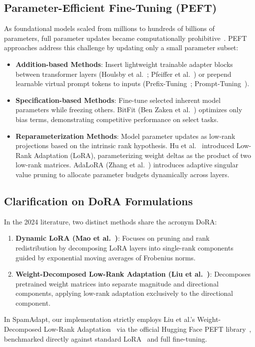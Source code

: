 \documentclass[conference]{IEEEtran}
\begin{document}
\subsection{Parameter-Efficient Fine-Tuning (PEFT)}
As foundational models scaled from millions to hundreds of billions of parameters, full parameter updates became computationally prohibitive~\cite{ding2023peft_nature}. PEFT approaches address this challenge by updating only a small parameter subset:
\begin{itemize}
    \item \textbf{Addition-based Methods}: Insert lightweight trainable adapter blocks between transformer layers (Houlsby et al.~\cite{houlsby2019adapter}; Pfeiffer et al.~\cite{pfeiffer2021adapterfusion}) or prepend learnable virtual prompt tokens to inputs (Prefix-Tuning~\cite{li2021prefix}; Prompt-Tuning~\cite{lester2021prompt}).
    \item \textbf{Specification-based Methods}: Fine-tune selected inherent model parameters while freezing others. BitFit (Ben Zaken et al.~\cite{zaken2022bitfit}) optimizes only bias terms, demonstrating competitive performance on select tasks.
    \item \textbf{Reparameterization Methods}: Model parameter updates as low-rank projections based on the intrinsic rank hypothesis. Hu et al.~\cite{hu2022lora} introduced Low-Rank Adaptation (LoRA), parameterizing weight deltas as the product of two low-rank matrices. AdaLoRA (Zhang et al.~\cite{zhang2023adalora}) introduces adaptive singular value pruning to allocate parameter budgets dynamically across layers.
\end{itemize}

\subsection{Clarification on DoRA Formulations}
In the 2024 literature, two distinct methods share the acronym DoRA:
\begin{enumerate}
    \item \textbf{Dynamic LoRA (Mao et al.~\cite{mao2024dora_dynamic})}: Focuses on pruning and rank redistribution by decomposing LoRA layers into single-rank components guided by exponential moving averages of Frobenius norms.
    \item \textbf{Weight-Decomposed Low-Rank Adaptation (Liu et al.~\cite{liu2024dora})}: Decomposes pretrained weight matrices into separate magnitude and directional components, applying low-rank adaptation exclusively to the directional component.
\end{enumerate}
In SpamAdapt, our implementation strictly employs Liu et al.'s Weight-Decomposed Low-Rank Adaptation~\cite{liu2024dora} via the official Hugging Face PEFT library~\cite{peft2022}, benchmarked directly against standard LoRA~\cite{hu2022lora} and full fine-tuning.
\end{document}

